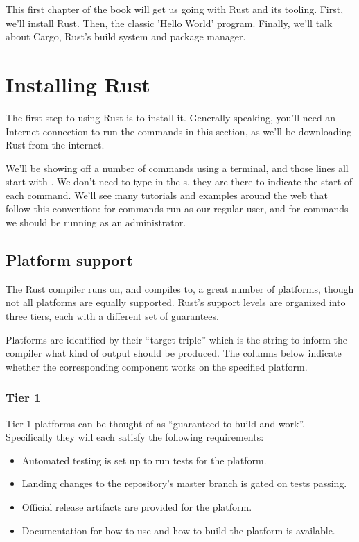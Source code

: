 This first chapter of the book will get us going with Rust and its tooling. First, we'll install Rust. Then, the classic 
'Hello World' program. Finally, we'll talk about Cargo, Rust's build system and package manager.

\section{Installing Rust}

The first step to using Rust is to install it. Generally speaking, you'll need an Internet connection to run the commands in 
this section, as we'll be downloading Rust from the internet.

\blank

We'll be showing off a number of commands using a terminal, and those lines all start with \code{\$}. We don't need to type in the 
\code{\$}s, they are there to indicate the start of each command. We'll see many tutorials and examples around the web that follow 
this convention: \code{\$} for commands run as our regular user, and \code{\#} for commands we should be running as an administrator.

\subsection*{Platform support}

The Rust compiler runs on, and compiles to, a great number of platforms, though not all platforms are equally supported. 
Rust's support levels are organized into three tiers, each with a different set of guarantees.

\blank

Platforms are identified by their \enquote{target triple} which is the string to inform the compiler what kind of output should 
be produced. The columns below indicate whether the corresponding component works on the specified platform.

\subsubsection*{Tier 1}

Tier 1 platforms can be thought of as \enquote{guaranteed to build and work}. Specifically they will each satisfy the 
following requirements:

\begin{itemize}
    \item{Automated testing is set up to run tests for the platform.}
    \item{Landing changes to the  repository's master branch is gated on tests passing.}
    \item{Official release artifacts are provided for the platform.}
    \item{Documentation for how to use and how to build the platform is available.}
\end{itemize}

